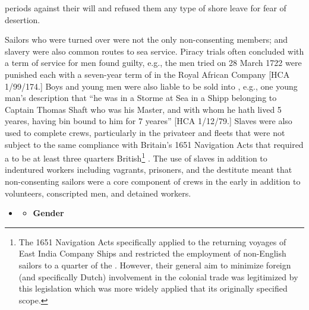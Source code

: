 periods against their will and refused them any type of shore leave for fear of desertion. 

Sailors who were turned over were not the only non-consenting  members;  and slavery were also common routes to sea service. Piracy trials often concluded with a term of service for men found guilty, e.g., the men tried on 28 March {1722} were punished each with a seven-year term of  in the Royal African Company [HCA 1/99/174.] Boys and young men were also liable to be sold into , e.g., one young man’s description that “he was in a Storme at Sea in a Shipp belonging to Captain Thomas Shaft who was his Master, and with whom he hath lived 5 yeares, having bin bound to him for 7 yeares” [HCA 1/12/79.] Slaves were also used to complete crews, particularly in the privateer and  fleets that were not subject to the same compliance with Britain's 1651 Navigation Acts that required a  to be at least three quarters British\footnote{The {1651} Navigation Acts specifically applied to the returning voyages of East India Company Ships and restricted the employment of non-English sailors to a quarter of the . However, their general aim to minimize foreign (and specifically Dutch) involvement in the colonial trade was legitimized by this legislation which was more widely applied that its originally specified scope.} . The use of slaves in addition to indentured workers including vagrants, prisoners, and the destitute meant that non-consenting sailors were a core component of crews in the early  in addition to volunteers, conscripted men, and detained workers. 


\begin{itemize}
\item 
\begin{itemize}
\item \textbf{Gender}
\end{itemize}
\end{itemize}

